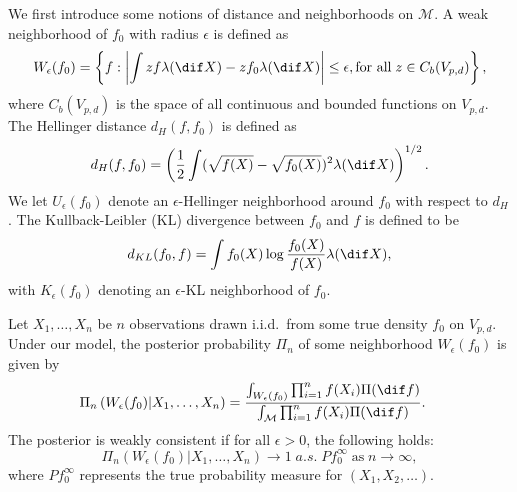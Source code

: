 We first introduce some notions of distance and  neighborhoods on  $\mathcal{M}$.
A weak neighborhood  of $f_0$ with radius $\epsilon$ is defined as
\begin{equation}
\label{eq-weaknb}
W_{\epsilon}(f_0)=\left\{f: \left|\int zf\lambda(\dif X)- zf_0\lambda(\dif X)\right|\leq \epsilon, \text{for all}\; z\in C_b(V_{p,d}) \right\},
\end{equation}
where $C_b(V_{p,d})$ is the space of all continuous and bounded functions on $V_{p,d}$.
The  Hellinger  distance $d_H(f,f_0)$ is defined as
\begin{eqnarray*}
d_H(f,f_0) = \left(\dfrac{1}{2}\int (\sqrt{f(X)}-\sqrt{f_0(X)})^2\lambda(\dif X)\right)^{1/2}.
\end{eqnarray*}
 We let $U_{\epsilon}(f_0)$ denote  an $\epsilon$-Hellinger neighborhood around
$f_0$ with respect to $d_H$.  The Kullback-Leibler (KL)  divergence between $f_0$ and $f$  is defined to be
\begin{align}
\label{eq-KLdivergence}
d_{KL}(f_0,f)=\int  f_0(X) \log \dfrac{ f_0(X)}{f(X)}\lambda(\dif X),
\end{align}
with $K_{\epsilon}(f_0)$ denoting an $\epsilon$-KL neighborhood of $f_0$.

Let $X_1,\ldots, X_n$ be $n$ observations drawn i.i.d.\ from some true density $f_0$ on $V_{p,d}$.
 Under our model, the posterior probability $\Pi_{n}$ of some neighborhood  $W_\epsilon(f_0)$ is given by
\begin{align}
\label{eq-posteq}
\Pi_{n}\left(W_\epsilon(f_0)|X_1,\ldots, X_n\right)&=\dfrac{\int_{W_\epsilon(f_0)} \prod_{i=1}^n f(X_i)\Pi(\dif f)}{\int_{\mathcal{M}} \prod_{i=1}^n f(X_i)\Pi(\dif f)}.
\end{align}
 The posterior is  weakly consistent if for all $\epsilon>0$,  the following holds:
\begin{equation}
\Pi_{n}\left(W_\epsilon(f_0)|X_1,\ldots, X_n\right)\rightarrow 1 \;a.s. \;Pf_0^{\infty}\; \text{as}\; n\rightarrow \infty,
\end{equation}
where $Pf_0^{\infty}$ represents the true probability measure for $(X_1, X_2,\ldots)$.




